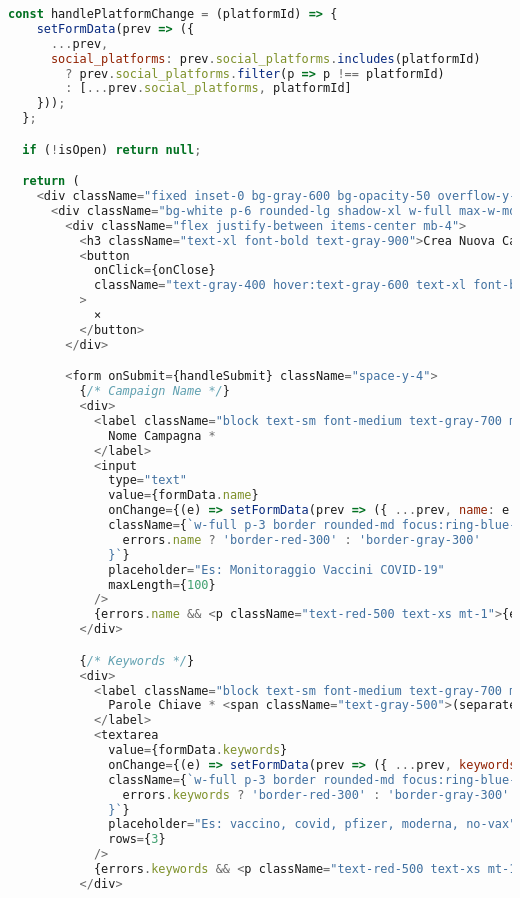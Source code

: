 \documentclass[12pt,a4paper]{report}
\begin{document}
\begin{lstlisting}[language=JavaScript, caption=CreateCampaignModal.jsx]
  const handlePlatformChange = (platformId) => {
    setFormData(prev => ({
      ...prev,
      social_platforms: prev.social_platforms.includes(platformId)
        ? prev.social_platforms.filter(p => p !== platformId)
        : [...prev.social_platforms, platformId]
    }));
  };

  if (!isOpen) return null;

  return (
    <div className="fixed inset-0 bg-gray-600 bg-opacity-50 overflow-y-auto h-full w-full z-50 flex items-center justify-center">
      <div className="bg-white p-6 rounded-lg shadow-xl w-full max-w-md mx-4">
        <div className="flex justify-between items-center mb-4">
          <h3 className="text-xl font-bold text-gray-900">Crea Nuova Campagna</h3>
          <button
            onClick={onClose}
            className="text-gray-400 hover:text-gray-600 text-xl font-bold"
          >
            ×
          </button>
        </div>

        <form onSubmit={handleSubmit} className="space-y-4">
          {/* Campaign Name */}
          <div>
            <label className="block text-sm font-medium text-gray-700 mb-1">
              Nome Campagna *
            </label>
            <input
              type="text"
              value={formData.name}
              onChange={(e) => setFormData(prev => ({ ...prev, name: e.target.value }))}
              className={`w-full p-3 border rounded-md focus:ring-blue-500 focus:border-blue-500 ${
                errors.name ? 'border-red-300' : 'border-gray-300'
              }`}
              placeholder="Es: Monitoraggio Vaccini COVID-19"
              maxLength={100}
            />
            {errors.name && <p className="text-red-500 text-xs mt-1">{errors.name}</p>}
          </div>

          {/* Keywords */}
          <div>
            <label className="block text-sm font-medium text-gray-700 mb-1">
              Parole Chiave * <span className="text-gray-500">(separate da virgola)</span>
            </label>
            <textarea
              value={formData.keywords}
              onChange={(e) => setFormData(prev => ({ ...prev, keywords: e.target.value }))}
              className={`w-full p-3 border rounded-md focus:ring-blue-500 focus:border-blue-500 ${
                errors.keywords ? 'border-red-300' : 'border-gray-300'
              }`}
              placeholder="Es: vaccino, covid, pfizer, moderna, no-vax"
              rows={3}
            />
            {errors.keywords && <p className="text-red-500 text-xs mt-1">{errors.keywords}</p>}
          </div>


\end{lstlisting}
\end{document}
